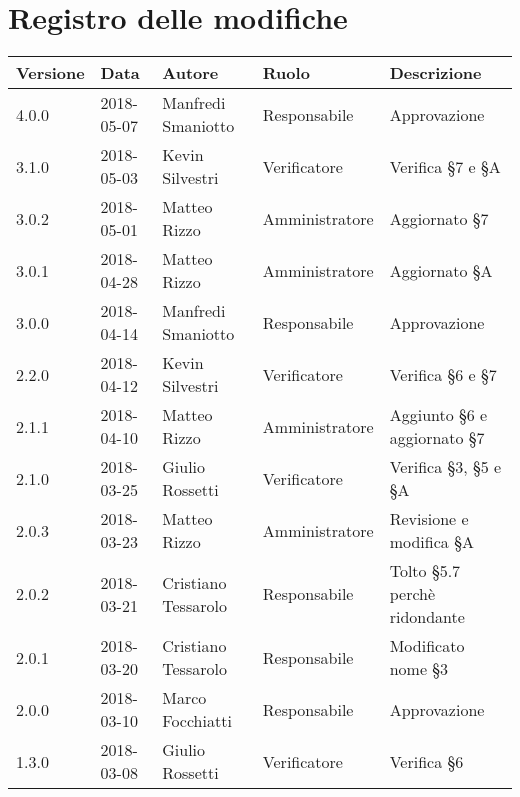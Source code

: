 \documentclass[./PianodiProgetto.tex]{subfiles}
\begin{document}
\chapter*{Registro delle modifiche}
\setlength\LTleft{-22mm}
\begin{longtable}{|p{20mm}|p{20mm}|p{40mm}|p{30mm}|p{50mm}|}
	\hline
	\textbf{Versione} & \textbf{Data} & \textbf{Autore} & \textbf{Ruolo} & \textbf{Descrizione} \\ 
	
		\hline 4.0.0 & 2018-05-07 & Manfredi Smaniotto & Responsabile & Approvazione \\
		
		\hline 3.1.0 & 2018-05-03 & Kevin Silvestri & Verificatore & Verifica §7 e §A \\
		
		\hline 3.0.2 & 2018-05-01 & Matteo Rizzo & Amministratore & Aggiornato §7 \\ 
		
		\hline 3.0.1 & 2018-04-28 & Matteo Rizzo & Amministratore & Aggiornato §A \\ 
		
		
	
		\hline 3.0.0 & 2018-04-14 & Manfredi Smaniotto & Responsabile & Approvazione \\
	
		\hline 2.2.0 & 2018-04-12 & Kevin Silvestri & Verificatore & Verifica §6 e §7 \\
	
		\hline 2.1.1 & 2018-04-10 & Matteo Rizzo & Amministratore & Aggiunto §6 e aggiornato §7 \\ 
		
		\hline 2.1.0 & 2018-03-25 & Giulio Rossetti & Verificatore & Verifica §3, §5 e §A  \\
	
		\hline 2.0.3 & 2018-03-23 & Matteo Rizzo & Amministratore & Revisione e modifica §A \\
		
		\hline 2.0.2 & 2018-03-21 & Cristiano Tessarolo & Responsabile & Tolto §5.7 perchè ridondante \\
	
		\hline 2.0.1 & 2018-03-20 & Cristiano Tessarolo & Responsabile & Modificato nome §3 \\
	
		\hline 2.0.0 & 2018-03-10 & Marco Focchiatti & Responsabile & Approvazione \\
		
		\hline 1.3.0 & 2018-03-08 & Giulio Rossetti & Verificatore & Verifica §6 \\
		

\end{longtable}
\end{document}
